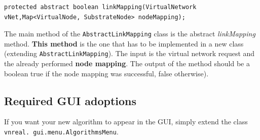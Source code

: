 \begin{lstlisting}
protected abstract boolean linkMapping(VirtualNetwork vNet,Map<VirtualNode, SubstrateNode> nodeMapping);
\end{lstlisting}
The main method of the \texttt{AbstractLinkMapping} class is the abstract \textsl{linkMapping} method. 
\textbf{This method} is the one that has to be implemented in a new class (extending \texttt{AbstractLinkMapping}). 
The input is the virtual network request and the already performed \textbf{node mapping}. 
The output of the method should be a boolean true if the node mapping was successful, false otherwise).


\subsection{Required GUI adoptions}
If you want your new algorithm to appear in the GUI, simply extend the class \texttt{vnreal. gui.menu.AlgorithmsMenu}.

